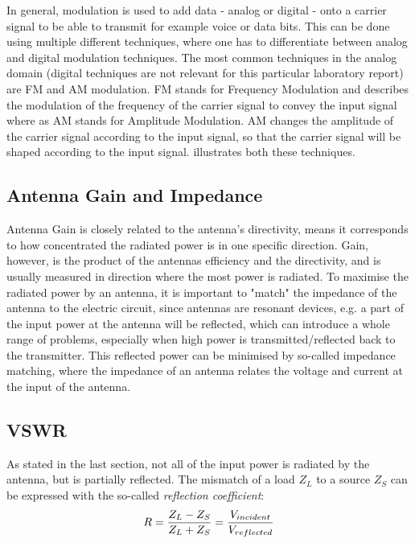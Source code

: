 In general, modulation is used to add data - analog or digital - onto a carrier signal to be able to transmit for example voice or data bits. This can be done using multiple different techniques, where one has to differentiate between analog and digital modulation techniques. The most common techniques in the analog domain (digital techniques are not relevant for this particular laboratory report) are FM and AM modulation. FM stands for Frequency Modulation and describes the modulation of the frequency of the carrier signal to convey the input signal where as AM stands for Amplitude Modulation. AM changes the amplitude of the carrier signal according to the input signal, so that the carrier signal will be shaped according to the input signal.
 illustrates both these techniques.

\subsection{Antenna Gain and Impedance}
Antenna Gain is closely related to the antenna's directivity, means it corresponds to how concentrated the radiated power is in one specific direction. 
Gain, however, is the product of the antennas efficiency and the directivity, and is usually measured in direction where the most power is radiated.
To maximise the radiated power by an antenna, it is important to "match" the impedance of the antenna to the electric circuit, since antennas are resonant devices, e.g. a part of the input power at the antenna will be reflected, which can introduce a whole range of problems, especially when high power is transmitted/reflected back to the transmitter. This reflected power can be minimised by so-called impedance matching, where the impedance of an antenna relates the voltage and current at the input of the antenna.\\

\subsection{VSWR}
\label{sec:vswr}
As stated in the last section, not all of the input power is radiated by the antenna, but is partially reflected. The mismatch of a load $Z_L$ to a source $Z_S$ can be expressed with the so-called \textit{reflection coefficient}:
\begin{equation}
	\centering
	R = \frac{Z_L - Z_S}{Z_L + Z_S} = \frac{V_{incident}}{V_{reflected}}
\end{equation}

